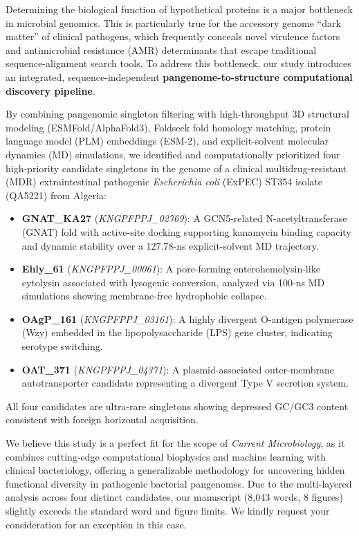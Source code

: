 \documentclass[10pt]{article}
\begin{document}
Determining the biological function of hypothetical proteins is a major bottleneck in microbial genomics. This is particularly true for the accessory genome ``dark matter'' of clinical pathogens, which frequently conceals novel virulence factors and antimicrobial resistance (AMR) determinants that escape traditional sequence-alignment search tools. To address this bottleneck, our study introduces an integrated, sequence-independent \textbf{pangenome-to-structure computational discovery pipeline}. 

By combining pangenomic singleton filtering with high-throughput 3D structural modeling (ESMFold/AlphaFold3), Foldseek fold homology matching, protein language model (PLM) embeddings (ESM-2), and explicit-solvent molecular dynamics (MD) simulations, we identified and computationally prioritized four high-priority candidate singletons in the genome of a clinical multidrug-resistant (MDR) extraintestinal pathogenic \textit{Escherichia coli} (ExPEC) ST354 isolate (QA5221) from Algeria:
\begin{itemize}
    \item \textbf{GNAT\_KA27} (\textit{KNGPFPPJ\_02769}): A GCN5-related N-acetyltransferase (GNAT) fold with active-site docking supporting kanamycin binding capacity and dynamic stability over a 127.78-ns explicit-solvent MD trajectory.
    \item \textbf{Ehly\_61} (\textit{KNGPFPPJ\_00061}): A pore-forming enterohemolysin-like cytolysin associated with lysogenic conversion, analyzed via 100-ns MD simulations showing membrane-free hydrophobic collapse.
    \item \textbf{OAgP\_161} (\textit{KNGPFPPJ\_03161}): A highly divergent O-antigen polymerase (Wzy) embedded in the lipopolysaccharide (LPS) gene cluster, indicating serotype switching.
    \item \textbf{OAT\_371} (\textit{KNGPFPPJ\_04371}): A plasmid-associated outer-membrane autotransporter candidate representing a divergent Type V secretion system.
\end{itemize}
All four candidates are ultra-rare singletons showing depressed GC/GC3 content consistent with foreign horizontal acquisition. 

We believe this study is a perfect fit for the scope of \textit{Current Microbiology}, as it combines cutting-edge computational biophysics and machine learning with clinical bacteriology, offering a generalizable methodology for uncovering hidden functional diversity in pathogenic bacterial pangenomes. Due to the multi-layered analysis across four distinct candidates, our manuscript (8,043 words, 8 figures) slightly exceeds the standard word and figure limits. We kindly request your consideration for an exception in this case.
\end{document}
